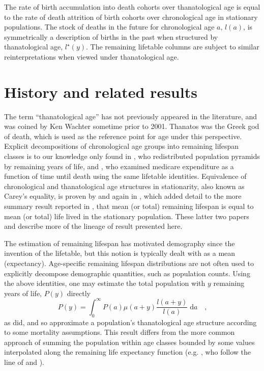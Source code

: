 \documentclass{article}
\newcommand{\dd}{\; \mathrm{d}}
\begin{document}
The rate of birth accumulation into death cohorts over thanatological age is
equal to the rate of death attrition of birth cohorts over chronological age in
stationary populations. The stock of deaths in the future for
chronological age $a$, $l(a)$, is symmetrically a description of births in the
past when structured by thanatological age, $l^\star(y)$. The remaining
lifetable columns are subject to similar reinterpretations when viewed under
thanatological age.

\section*{History and related results}

The term ``thanatological age'' has not previously appeared in the
literature, and was coined by Ken Wachter sometime prior to 2001. Thanatos was
the Greek god of death, which is used as the reference point for age under this
perspective. Explicit decompositions of chronological
age groups into remaining lifespan classes is to our knowledge only found in
\citet{brouard1986structure}, who redistributed
population pyramids by remaining years of life, and
\citet{miller2001increasing}, who examined medicare expenditure as a function of time until death using the
same lifetable identities. Equivalence of chronological and
thanatological age structures in stationarity, also known as Carey's equality,
is proven by \citet{brouard1989mouvements} and again in
 \citet{vaupel2009life}, which added detail to the more summary result reported
 in \citet{goldstein2009life}, that mean (or total) remaining lifespan is equal to mean (or total) life lived in the stationary population.
These latter two papers and \citet{goldstein2012historical} describe more of the
lineage of result presented here. 

The estimation of remaining lifespan has motivated demography since
the invention of the lifetable, but this notion is typically dealt with as a
mean (expectancy). Age-specific remaining lifespan distributions are not often
used to explicitly decompose demographic quantities, such as population counts. Using
the above identities, one may estimate the total population with $y$
remaining years of life, $P(y)$ directly
\begin{equation}
\label{eq:getpy}
P(y) = \int _0 ^\infty P(a)\mu(a+y)\frac{l(a+y)}{l(a)} \dd a \quad \text{,}
\end{equation}
\noindent as \citet{brouard1986structure} did, and so approximate a population's
thanatological age structure according to some mortality assumptions. This result differs from the more common approach
of summing the population within age classes bounded by some values interpolated
along the remaining life expectancy function (e.g.
\citet{sanderson2005average,sanderson2007new,sanderson2010remeasuring}, who
follow the line of \citet{hersch1944demographie} and \citet{ryder1975notes}).
\end{document}
